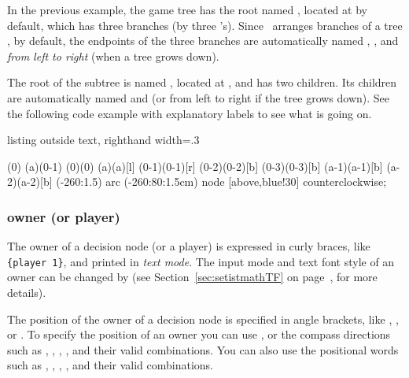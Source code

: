 In the previous example, the game tree has the root named , located at  by default, which has three branches (by three \cmd{\istb}'s).
Since \TikZ\ arranges branches of a tree , by default,
the endpoints of the three branches are automatically named , , and  \emph{from left to right} (when a tree grows down).

The root of the subtree is named , located at , and has two children.
Its children are automatically named  and   (or from left to right if the tree grows down).
See the following code example with explanatory labels to see what is going on.

\begin{tcblisting}{listing outside text, righthand width=.3\linewidth}
\begin{istgame}[font=\scriptsize]
\istroot(0)
  \istb  \istb  \istb \endist
\istroot(a)(0-1)
  \istb  \istb  \endist
\xtOwner(0){(0)}
\xtOwner(a){(a)}[l]
\xtPayoff*(0-1){(0-1)}[r]
\xtPayoff*(0-2){(0-2)}[b]
\xtPayoff*(0-3){(0-3)}[b]
\xtPayoff*(a-1){(a-1)}[b]
\xtPayoff*(a-2){(a-2)}[b]
(-260:1.5) 
  arc (-260:80:1.5cm)
  node [above,blue!30] {counterclockwise};
\end{istgame}
\end{tcblisting}
\label{page:clockwise}


\subsubsection*{owner (or player)}

The owner of a decision node (or a player) is expressed in curly braces, like \verb|{player 1}|, and printed in \emph{text mode}. The input mode and text font style of an owner can be changed by \cmd{\setistmathTF(*)} 
(see Section~\ref{sec:setistmathTF} on page~\pageref{sec:setistmathTF}, for more details).

The position of the owner of a decision node is specified in angle brackets, like , , or .
To specify the position of an owner you can use , or the compass directions such as , , , , and their valid combinations.
You can also use the positional words such as , , , , and their valid combinations.

